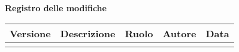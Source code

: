 \newpage
\begin{center}
	\Large{\textbf{Registro delle modifiche}}
	\\\vspace{0.5cm}
	\normalsize
	\begin{tabularx}{\textwidth}{cXccc}
		\textbf{Versione} & \textbf{Descrizione} & \textbf{Ruolo} & \textbf{Autore} & \textbf{Data} \\\toprule
		\modifiche
		\bottomrule
	\end{tabularx}
\end{center}
\newpage

